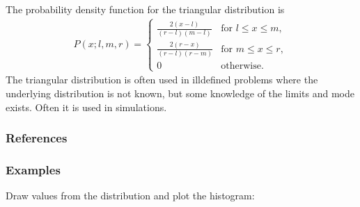 \documentclass[letterpaper,10pt,english]{sphinxmanual}
\begin{document}
\begin{fulllineitems}
\sphinxAtStartPar
The probability density function for the triangular distribution is
\begin{equation*}
\begin{split}P(x;l, m, r) = \begin{cases}
\frac{2(x-l)}{(r-l)(m-l)}& \text{for $l \leq x \leq m$},\\
\frac{2(r-x)}{(r-l)(r-m)}& \text{for $m \leq x \leq r$},\\
0& \text{otherwise}.
\end{cases}\end{split}
\end{equation*}
\sphinxAtStartPar
The triangular distribution is often used in ill\sphinxhyphen{}defined
problems where the underlying distribution is not known, but
some knowledge of the limits and mode exists. Often it is used
in simulations.
\subsubsection*{References}
\subsubsection*{Examples}

\sphinxAtStartPar
Draw values from the distribution and plot the histogram:

\begin{sphinxVerbatim}[commandchars=\\\{\}]
   
      
             
\end{sphinxVerbatim}

\end{fulllineitems}

\end{document}
